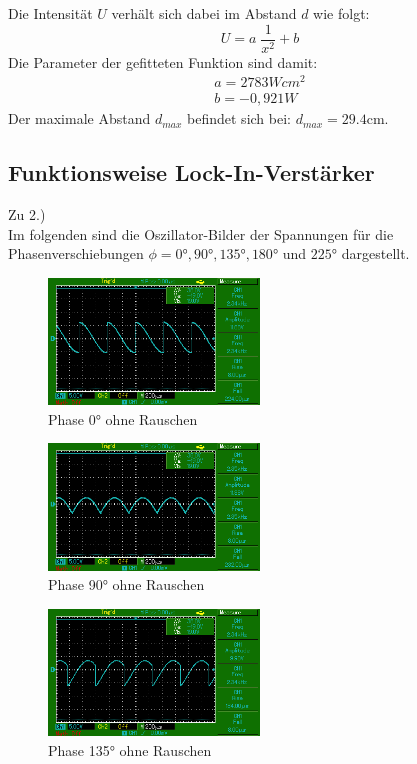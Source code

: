 Die Intensität $U$ verhält sich dabei im Abstand $d$ wie folgt:
\begin{equation*}
    U=a\;\frac{1}{x^2}+b
\end{equation*}
Die Parameter der gefitteten Funktion sind damit:
\begin{align}
    a= 2783 Wcm^2\\
    b= -0,921 W
\end{align}
Der maximale Abstand $d_{max}$ befindet sich bei: $d_{max}=29.4$cm.

\subsection{Funktionsweise Lock-In-Verstärker}
Zu 2.)\\
Im folgenden sind die Oszillator-Bilder der Spannungen für die Phasenverschiebungen $\phi = 0°, 90°, 135°, 180°$ und $225°$ dargestellt.

\begin{figure}
    \centering
    \includegraphics[width=0.5\textwidth]{bilder/MAP001.png}
    \caption{Phase 0° ohne Rauschen}        
    \label{fig:MAP001}
\end{figure}

\begin{figure}
    \centering
    \includegraphics[width=0.5\textwidth]{bilder/MAP002.png}
    \caption{Phase 90° ohne Rauschen}        
    \label{fig:MAP002}
\end{figure}

\begin{figure}
    \centering
    \includegraphics[width=0.5\textwidth]{bilder/MAP005.png}
    \caption{Phase 135° ohne Rauschen}        
    \label{fig:MAP005}
\end{figure}

